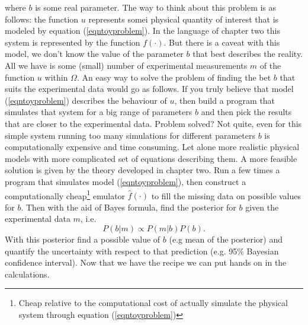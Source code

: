 \documentclass[12pt]{book}
\begin{document}
where $b$ is some real parameter. The  way to think about this problem is as follows: the 
function $u$ represents somei physical quantity of interest that is modeled by equation (\ref{eqntoyproblem}).
In the language of chapter two this system is represented by the function $f(\cdot)$. But there is a 
caveat with this model, we don't know the value of the parameter $b$ that best describes the reality.
All we have is some (small) number of experimental measurements $m$  of the function $u$ within $\Omega$. 
An easy way to solve the problem of finding the bet $b$ that suits the experimental data would go as follows.
If you truly believe that model (\ref{eqntoyproblem}) describes the behaviour of $u$, then build
a program that simulates that system for a big range of parameters $b$ and then pick the results
that are closer to the experimental data. Problem solved? Not quite, even for this simple system
running too many simulations for different parameters $b$ is computationally expensive and time
consuming. Let alone more realistic physical models with more complicated set of equations describing
them. 
\newline
A more feasible solution is given by the theory developed in chapter two. Run a few times a program
that simulates model (\ref{eqntoyproblem}), then construct a computationally cheap\footnote{Cheap relative
to the computational cost of actually simulate the physical system through equation (\ref{eqntoyproblem})}
 emulator $\hat{f}(\cdot)$ to fill the missing data on possible values for $b$. Then with  the 
aid of Bayes formula, find the posterior for $b$ given the experimental data $m$, i.e.
\begin{equation*}
P(b|m)\propto P(m|b)P(b).
\end{equation*}
With this posterior find a possible value of $b$ (e.g mean of the posterior) and quantify the uncertainty
with respect to that prediction (e.g. 95\% Bayesian confidence interval). Now that we have the recipe we
can put hands on in the calculations. 
\newline
\end{document}
